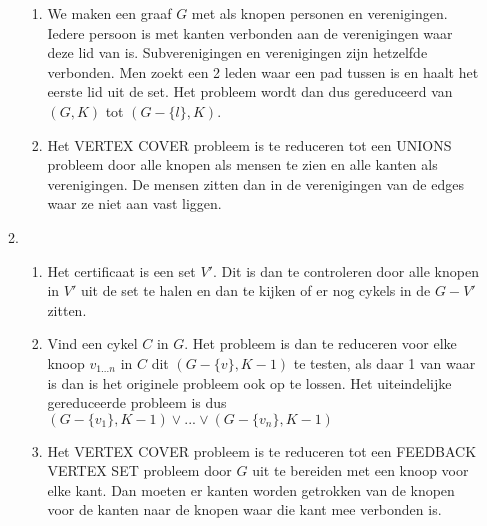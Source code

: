\documentclass[11pt]{article}
\begin{document}
\begin{enumerate}
\begin{enumerate}
\begin{enumerate}[a]
                    \item We maken een graaf $G$ met als knopen personen en
                        verenigingen. Iedere persoon is met kanten verbonden aan
                        de verenigingen waar deze lid van is. Subverenigingen en
                        verenigingen zijn hetzelfde verbonden.
                        Men zoekt een 2 leden waar een pad tussen is en haalt
                        het eerste lid uit de set. Het probleem wordt dan dus
                        gereduceerd van $(G, K)$ tot $(G - \{l\}, K)$.

                    \item
                        Het VERTEX COVER probleem is te reduceren tot een UNIONS
                        probleem door alle knopen als mensen te zien en alle
                        kanten als verenigingen. De mensen zitten dan in de
                        verenigingen van de edges waar ze niet aan vast liggen.

                \end{enumerate}
            \item
                \begin{enumerate}[a]
                    \item
                        Het certificaat is een set $V'$. Dit is dan te
                        controleren door alle knopen in $V'$ uit de set te
                        halen en dan te kijken of er nog cykels in de $G - V'$
                        zitten.

                    \item
                        Vind een cykel $C$ in $G$. Het probleem is dan te
                        reduceren voor elke knoop $v_{1...n}$ in $C$ dit $(G -
                        \{v\}, K - 1)$ te testen, als daar 1 van waar is dan is
                        het originele probleem ook op te lossen. Het
                        uiteindelijke gereduceerde probleem is dus $(G -
                        \{v_1\}, K - 1) \lor ... \lor (G - \{v_n\}, K - 1)$

                    \item
                        Het VERTEX COVER probleem is te reduceren tot een
                        FEEDBACK VERTEX SET probleem door $G$ uit te bereiden
                        met een knoop voor elke kant. Dan moeten er kanten
                        worden getrokken van de knopen voor de kanten naar de
                        knopen waar die kant mee verbonden is.


\end{enumerate}
\end{enumerate}
\end{enumerate}
\end{document}
